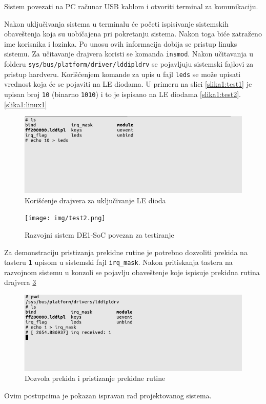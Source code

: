 Sistem povezati na PC računar USB kablom i otvoriti terminal za komunikaciju.

Nakon uključivanja sistema u terminalu će početi ispisivanje sistemskih obaveštenja koja su uobičajena pri pokretanju sistema. Nakon toga biće zatraženo ime korisnika i lozinka. Po unosu ovih informacija dobija se pristup linuks sistemu. Za učitavanje drajvera koristi se komanda \texttt{insmod}. Nakon učitavanja u folderu \texttt{sys/bus/platform/driver/lddipldrv} se pojavljuju sistemski fajlovi za pristup hardveru. Korišćenjem komande za upis u fajl \texttt{leds} se može upisati vrednost koja će se pojaviti na LE diodama. U primeru na slici \ref{slika1:test1} je upisan broj \texttt{10} (binarno \texttt{1010}) i to je ispisano na LE diodama \ref{slika1:test2}.
\ref{slika1:linux1}
\begin{figure}[h!]
\centering
\includegraphics[scale=0.5]{img/test1.png}
\caption{Korišćenje drajvera za uključivanje LE dioda}
\label{slika1:de1}
\end{figure}
\begin{figure}[h!]
\centering
\texttt{[image: img/test2.png]}
\caption{Razvojni sistem DE1-SoC povezan za testiranje}
\label{slika1:de1}
\end{figure}
Za demonstraciju pristizanja prekidne rutine je potrebno dozvoliti prekida na tasteru \texttt{1} upisom u sistemski fajl \texttt{irq\_mask}. Nakon pritiskanja tastera na razvojnom sistemu u konzoli se pojavlju obaveštenje koje ispisuje prekidna rutina drajvera \ref{slika1:test3}\\
\begin{figure}[h!]
\centering
\includegraphics[scale=0.5]{img/test3.png}
\caption{Dozvola prekida i pristizanje prekidne rutine}
\label{slika1:test3}
\end{figure}
Ovim postupcima je pokazan ispravan rad projektovanog sistema. \\
\pagebreak

